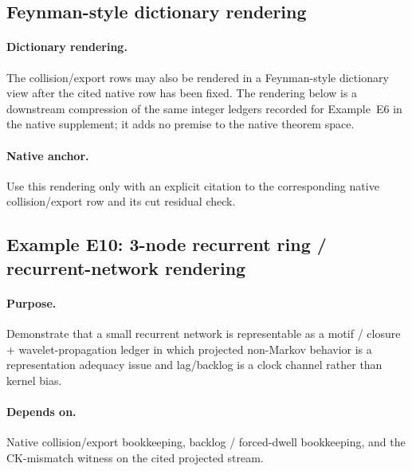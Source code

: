 \subsection{Feynman-style dictionary rendering}\label{app:feynman-dict}
\paragraph{Dictionary rendering.} The collision/export rows may also be rendered in a Feynman-style dictionary view after the cited native row has been fixed. The rendering below is a downstream compression of the same integer ledgers recorded for Example~E6 in the native supplement; it adds no premise to the native theorem space.

\begin{center}
\end{center}

\paragraph{Native anchor.} Use this rendering only with an explicit citation to the corresponding native collision/export row and its cut residual check.


\subsection{Example E10: 3-node recurrent ring / recurrent-network rendering}\label{app:e10-neural}
\paragraph{Purpose.} Demonstrate that a small recurrent network is representable as a motif / closure + wavelet-propagation ledger in which projected non-Markov behavior is a representation adequacy issue and lag/backlog is a clock channel rather than kernel bias.
\paragraph{Depends on.} Native collision/export bookkeeping, backlog / forced-dwell bookkeeping, and the CK-mismatch witness on the cited projected stream.
